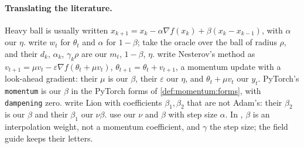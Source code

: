 \begin{refsection}
\paragraph{Translating the literature.} Heavy ball is usually written $x_{k+1}=x_k-\alpha\nabla f(x_k)+\beta(x_k-x_{k-1})$, with $\alpha$ our $\eta$. \Textcite{CutkoskyMehta2020} write $w_t$ for $\theta_t$ and $\alpha$ for $1-\beta$; \textcite{PethickEtAl2025} take the oracle over the ball of radius $\rho$, and their $d_k$, $\alpha_k$, $\gamma_k\rho$ are our $m_t$, $1-\beta$, $\eta$. \Textcite{SutskeverEtAl2013} write Nesterov's method as $v_{t+1}=\mu v_t-\varepsilon\nabla f(\theta_t+\mu v_t)$, $\theta_{t+1}=\theta_t+v_{t+1}$, a momentum update with a look-ahead gradient: their $\mu$ is our $\beta$, their $\varepsilon$ our $\eta$, and $\theta_t+\mu v_t$ our $y_t$. PyTorch's \texttt{momentum} is our $\beta$ in the PyTorch forms of \cref{def:momentum:forms}, with \texttt{dampening} zero. \Textcite{ChenEtAl2023} write Lion with coefficients $\beta_1,\beta_2$ that are not Adam's: their $\beta_2$ is our $\beta$ and their $\beta_1$ our $\nu\beta$. \Textcite{MaYarats2019} use our $\nu$ and $\beta$ with step size $\alpha$. In \textcite{DefazioEtAl2024}, $\beta$ is an interpolation weight, not a momentum coefficient, and $\gamma$ the step size; the field guide keeps their letters.

\printchapterbib
\end{refsection}
